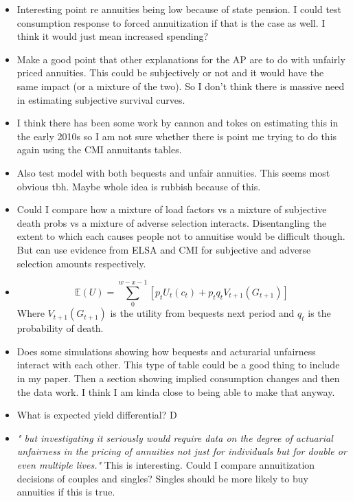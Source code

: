 \documentclass[12pt]{article}
\begin{document}
\begin{itemize}
  \item Interesting point re annuities being low because of state pension.
        I could test consumption response to forced annuitization if that is the
        case as well. I think it would just mean increased spending?

  \item Make a good point that other explanations for the AP are to do with unfairly priced
        annuities. This could be subjectively or not and it would have the same impact (or
        a mixture of the two). So I don't think there is massive need in estimating subjective
        survival curves.

  \item I think there has been some work by cannon and tokes on estimating this in the
        early 2010s so I am not sure whether there is point me trying to do this again using the
        CMI annuitants tables.

  \item Also test model with both bequests and unfair annuities. This seems most obvious tbh.
        Maybe whole idea is rubbish because of this.

  \item Could I compare how a mixture of load factors vs a mixture of subjective death probs
        vs a mixture of adverse selection interacts. Disentangling the extent to which each causes
        people not to annuitise would be difficult though. But can use evidence from ELSA and CMI for
        subjective and adverse selection amounts respectively.

  \item \begin{equation*}
          \mathbb{E}(U) = \sum_{0}^{w - x - 1}[p_{t}U_{t}(c_{t}) + p_{t}q_{t}V_{t+1}(G_{t+1})]
        \end{equation*}
        Where $V_{t+1}(G_{t+1})$ is the utility from bequests next period and $q_{t}$ is the probability of death.


  \item Does some simulations showing how bequests and acturarial unfairness interact with each other.
        This type of table could be a good thing to include in my paper. Then a section showing implied consumption
        changes and then the data work. I think I am kinda close to being able to make that anyway.

  \item What is expected yield differential? D
  \item \textit{" but investigating it seriously would require data on the
          degree of actuarial unfairness in the pricing of annuities not just for
          individuals but for double or even multiple lives."} This is interesting.
        Could I compare annuitization decisions of couples and singles? Singles
        should be more likely to buy annuities if this is true.


\end{itemize}
\end{document}
